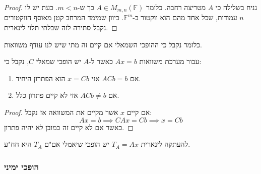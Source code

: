 \documentclass{tstextbook}
\begin{document}
\begin{proof}
נניח בשלילה כי \(A\) מטריצה רחבה. כלומר \(A \in M_{m,n}\left( \mathbb{F}  \right)\) כך ש-\(m<n\). כעת יש לו \(n\) עמודות, שכל אחד מהם הוא ווקטור ב-\(\mathbb{F} ^{m}\). כיוון שמימד המרחב קטן מאוסף הווקטורים נקבל סתירה לזה שבלתי תלוי לינארית.

\end{proof}
\begin{corollary}
כלומר נקבל כי ההופכי השמאלי אם קיים זה מתי שיש לנו עודף משוואות. 

\end{corollary}
\begin{proposition}
עבור מערכת משוואות \(Ax=b\) כאשר ל-\(A\) יש הופכי שמאלי \(C\), נקבל כי:

  \begin{enumerate}
    \item אם \(ACb=b\) אזי \(x=Cb\) הוא הפתרון היחיד. 


    \item אם \(ACb\neq b\) אזי לא קיים פתרון כלל. 


  \end{enumerate}
\end{proposition}
\begin{proof}
אם קיים \(x\) אשר מקיים את המשוואה אז נקבל:
$$Ax=b\implies CAx=Cb\implies x=Cb$$
כאשר אם לא קיים זה כמובן לא יהיה פתרון.

\end{proof}
\begin{proposition}
להעתקה לינארית \(T_{A}=Ax\) יש הופכי שיאמלי אם"ם \(T_{A}\) היא חח"ע.

\end{proposition}
\subsubsection{הופכי ימיני}
\end{document}
